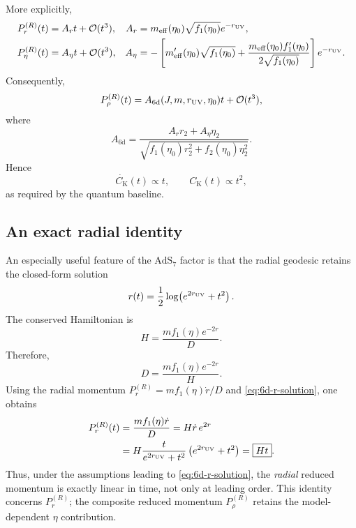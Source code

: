 \documentclass[11pt,a4paper]{article}
\theoremstyle{plain}
\theoremstyle{definition}
\theoremstyle{remark}
\newcommand{\PrR}{P_r^{(R)}}
\newcommand{\PetaR}{P_\eta^{(R)}}
\newcommand{\PrhoR}{P_\rho^{(R)}}
\newcommand{\Ck}{C_{\mathrm K}}
\newcommand{\meff}{m_{\mathrm{eff}}}
\begin{document}
More explicitly,
\begin{align*}
\PrR(t)
&=
A_r t+\mathcal O(t^3),
&
A_r
&=
\meff(\eta_0)\sqrt{f_1(\eta_0)}e^{-r_{\rm UV}},
\\
\PetaR(t)
&=
A_\eta t+\mathcal O(t^3),
&
A_\eta
&=
-\left[
\meff'(\eta_0)\sqrt{f_1(\eta_0)}
+
\frac{\meff(\eta_0)f_1'(\eta_0)}
{2\sqrt{f_1(\eta_0)}}
\right]e^{-r_{\rm UV}}.
\end{align*}
Consequently,
\begin{equation}
\PrhoR(t)
=
A_{\mathrm{6d}}(J,m,r_{\rm UV},\eta_0)t
+
\mathcal O(t^3),
\label{eq:6d-linear}
\end{equation}
where
\begin{equation*}
A_{\mathrm{6d}}
=
\frac{
A_r r_2+A_\eta\eta_2
}{
\sqrt{
f_1(\eta_0)r_2^2
+
f_2(\eta_0)\eta_2^2
}
}.
\end{equation*}
Hence
\begin{equation*}
\dot{\Ck}(t)\propto t,
\qquad
\Ck(t)\propto t^2,
\end{equation*}
as required by the quantum baseline.

\subsection{An exact radial identity}

An especially useful feature of the $\mathrm{AdS}_7$ factor is that the radial geodesic retains the closed-form solution
\begin{equation}
r(t)
=
\frac12
\log\!\left(e^{2r_{\rm UV}}+t^2\right).
\label{eq:6d-r-solution}
\end{equation}
The conserved Hamiltonian is
\begin{equation*}
H
=
\frac{
m f_1(\eta)e^{-2r}
}{
D
}.
\end{equation*}
Therefore,
\begin{equation*}
D
=
\frac{
m f_1(\eta)e^{-2r}
}{
H
}.
\end{equation*}
Using the radial momentum $\PrR=mf_1(\eta)\dot r/D$ and \eqref{eq:6d-r-solution}, one obtains
\begin{align*}
\PrR(t)
&=
\frac{
m f_1(\eta)\dot r
}{
D
}
=
H\dot r\,e^{2r}
\\
&=
H
\frac{t}{e^{2r_{\rm UV}}+t^2}
\left(e^{2r_{\rm UV}}+t^2\right)
=
\boxed{Ht}.
\end{align*}
Thus, under the assumptions leading to \eqref{eq:6d-r-solution}, the \emph{radial} reduced momentum is exactly linear in time, not only at leading order. This identity concerns $\PrR$; the composite reduced momentum $\PrhoR$ retains the model-dependent $\eta$ contribution.
\end{document}
